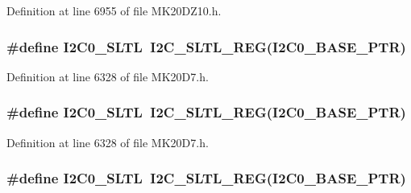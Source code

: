 Definition at line 6955 of file M\+K20\+D\+Z10.\+h.

\subsubsection[{\texorpdfstring{I2\+C0\+\_\+\+S\+L\+TL}{I2C0_SLTL}}]{\setlength{\rightskip}{0pt plus 5cm}\#define I2\+C0\+\_\+\+S\+L\+TL~{\bf I2\+C\+\_\+\+S\+L\+T\+L\+\_\+\+R\+EG}({\bf I2\+C0\+\_\+\+B\+A\+S\+E\+\_\+\+P\+TR})}\hypertarget{group___i2_c___register___accessor___macros_gae914eeb0f84c8cf2420f6764ea979c6d}{}\label{group___i2_c___register___accessor___macros_gae914eeb0f84c8cf2420f6764ea979c6d}


Definition at line 6328 of file M\+K20\+D7.\+h.

\subsubsection[{\texorpdfstring{I2\+C0\+\_\+\+S\+L\+TL}{I2C0_SLTL}}]{\setlength{\rightskip}{0pt plus 5cm}\#define I2\+C0\+\_\+\+S\+L\+TL~{\bf I2\+C\+\_\+\+S\+L\+T\+L\+\_\+\+R\+EG}({\bf I2\+C0\+\_\+\+B\+A\+S\+E\+\_\+\+P\+TR})}\hypertarget{group___i2_c___register___accessor___macros_gae914eeb0f84c8cf2420f6764ea979c6d}{}\label{group___i2_c___register___accessor___macros_gae914eeb0f84c8cf2420f6764ea979c6d}


Definition at line 6328 of file M\+K20\+D7.\+h.

\subsubsection[{\texorpdfstring{I2\+C0\+\_\+\+S\+L\+TL}{I2C0_SLTL}}]{\setlength{\rightskip}{0pt plus 5cm}\#define I2\+C0\+\_\+\+S\+L\+TL~{\bf I2\+C\+\_\+\+S\+L\+T\+L\+\_\+\+R\+EG}({\bf I2\+C0\+\_\+\+B\+A\+S\+E\+\_\+\+P\+TR})}\hypertarget{group___i2_c___register___accessor___macros_gae914eeb0f84c8cf2420f6764ea979c6d}{}\label{group___i2_c___register___accessor___macros_gae914eeb0f84c8cf2420f6764ea979c6d}



